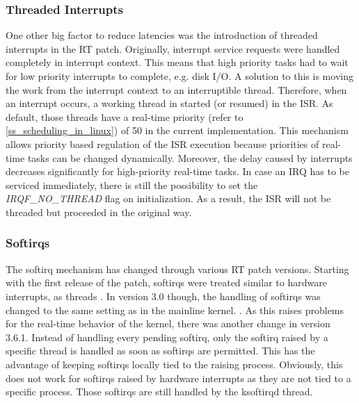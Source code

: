 \subsubsection{Threaded Interrupts}\label{ss_threaded_interrupts}
One other big factor to reduce latencies was the introduction of threaded interrupts in the RT patch.
Originally, interrupt service requests were handled completely in interrupt context.
This means that high priority tasks had to wait for low priority interrupts to complete, e.g. disk \ac{I/O}.
A solution to this is moving the work from the interrupt context to an interruptible thread.
Therefore, when an interrupt occurs, a working thread in started (or resumed) in the \ac{ISR}.
As default, those threads have a real-time priority (refer to \ref{ss_scheduling_in_linux}) of 50 in the current implementation.
This mechanism allows priority based regulation of the \ac{ISR} execution because priorities of real-time tasks can be changed dynamically. 
Moreover, the delay caused by interrupts decreases significantly for high-priority real-time tasks.
In case an \ac{IRQ} has to be serviced immediately, there is still the possibility to set the \textit{IRQF\_NO\_THREAD} flag on initialization.
As a result, the \ac{ISR} will not be threaded but proceeded in the original way.

\subsubsection{Softirqs}
The softirq mechanism has changed through various \ac{RT} patch versions.
Starting with the first release of the patch, softirqs were treated similar to hardware interrupts, as threads \cite{rostedt:iotrtp}.
In version 3.0 though, the handling of softirqs was changed to the same setting as in the mainline kernel. \cite{corbet:siar}.
As this raises problems for the real-time behavior of the kernel, there was another change in version 3.6.1.
Instead of handling every pending softirq, only the softirq raised by a specific thread is handled as soon as softirqs are permitted. 
This has the advantage of keeping softirqs locally tied to the raising process.
Obviously, this does not work for softirqs raised by hardware interrupts as they are not tied to a specific process.
Those softirqs are still handled by the ksoftirqd thread.

